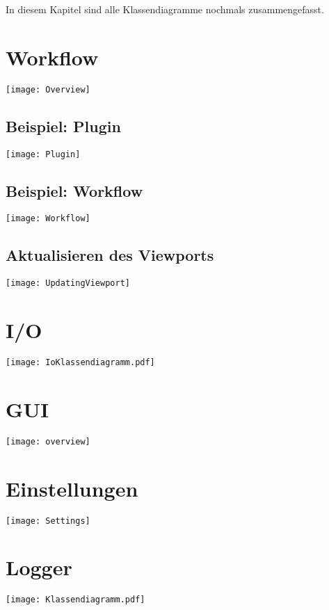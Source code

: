 In diesem Kapitel sind alle Klassendiagramme nochmals zusammengefasst.
\section{Workflow}
\graphicspath{{./img/workflow/}}
\texttt{[image: Overview]}
\subsection{Beispiel: Plugin}
\texttt{[image: Plugin]}
\subsection{Beispiel: Workflow}
\texttt{[image: Workflow]}
\subsection{Aktualisieren des Viewports}
\texttt{[image: UpdatingViewport]}
\newpage
\section{I/O}
\graphicspath{{./img/io/}}
\texttt{[image: IoKlassendiagramm.pdf]}
\newpage
\section{GUI}
\graphicspath{{./img/gui/}}
\texttt{[image: overview]}
\newpage
\section{Einstellungen}
\graphicspath{{./img/settings/}}
\texttt{[image: Settings]}
\newpage
\section{Logger}
\graphicspath{{./img/logger/}}
\texttt{[image: Klassendiagramm.pdf]}
